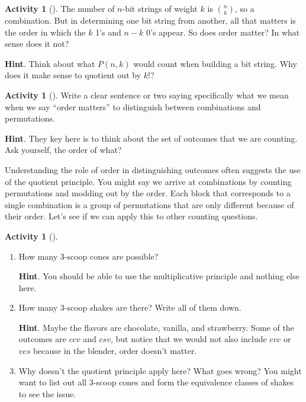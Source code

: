 \documentclass[10pt,]{book}
\theoremstyle{plain}
\theoremstyle{definition}
\theoremstyle{definition}
\theoremstyle{definition}
\newtheorem{activity}[project]{Activity}
\numberwithin{equation}{chapter}
\begin{document}
\begin{activity}[]\label{activity-110}
\hypertarget{p-798}{}%
The number of \(n\)-bit strings of weight \(k\) is \(\binom{n}{k}\), so a combination.  But in determining one bit string from another, all that matters is the order in which the \(k\) 1's and \(n-k\) 0's appear.  So does order matter?  In what sense does it not?%
\par\smallskip%
\noindent\textbf{Hint}.\hypertarget{hint-76}{}\quad%
\hypertarget{p-799}{}%
Think about what \(P(n,k)\) would count when building a bit string.  Why does it make sense to quotient out by \(k!\)?%
\end{activity}
\begin{activity}[]\label{activity-111}
\hypertarget{p-800}{}%
Write a clear sentence or two saying specifically what we mean when we say ``order matters'' to distinguish between combinations and permutations.%
\par\smallskip%
\noindent\textbf{Hint}.\hypertarget{hint-77}{}\quad%
\hypertarget{p-801}{}%
They key here is to think about the set of outcomes that we are counting.  Ask yourself, the order of what?%
\end{activity}
\hypertarget{p-802}{}%
Understanding the role of order in distinguishing outcomes often suggests the use of the quotient principle.  You might say we arrive at combinations by counting permutations and modding out by the order.  Each block that corresponds to a single combination is a group of permutations that are only different because of their order.  Let's see if we can apply this to other counting questions.%
\begin{activity}[]\label{activity-112}
\begin{enumerate}[font=\bfseries,label=(\alph*),ref=\alph*]
\item\label{task-150} \hypertarget{p-803}{}%
How many 3-scoop cones are possible?%
\par\smallskip%
\noindent\textbf{Hint}.\hypertarget{hint-78}{}\quad%
\hypertarget{p-804}{}%
You should be able to use the multiplicative principle and nothing else here.%
\item\label{task-151} \hypertarget{p-805}{}%
How many 3-scoop shakes are there?  Write all of them down.%
\par\smallskip%
\noindent\textbf{Hint}.\hypertarget{hint-79}{}\quad%
\hypertarget{p-806}{}%
Maybe the flavors are chocolate, vanilla, and strawberry.  Some of the outcomes are \(ccv\) and \(csv\), but notice that we would not also include \(cvc\) or \(vcs\) because in the blender, order doesn't matter.%
\item\label{task-152} \hypertarget{p-807}{}%
Why doesn't the quotient principle apply here?  What goes wrong?  You might want to list out all 3-scoop cones and form the equivalence classes of shakes to see the issue.%
\end{enumerate}
\end{activity}
\end{document}
